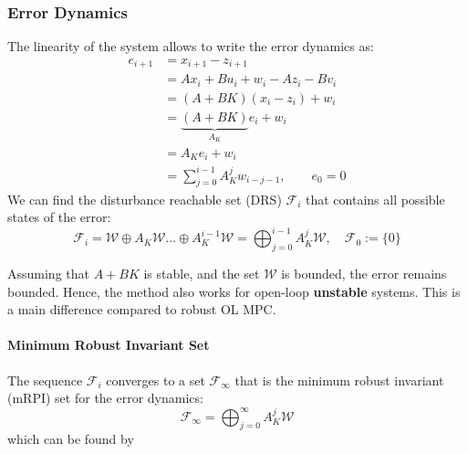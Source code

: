 \subsubsection{Error Dynamics}
The linearity of the system allows to write the error dynamics as:
\noindent\begin{align*}
    e_{i+1} & = x_{i+1} - z_{i+1}                              \\
            & = Ax_i + Bu_i + w_i - Az_i - Bv_i                \\
            & = (A+BK)(x_i - z_i) + w_i                        \\
            & = \underbrace{(A+BK)}_{A_K}e_i + w_i             \\
            & = A_K e_i + w_i                                  \\
            & = \sum_{j=0}^{i-1} A_K^j w_{i-j-1}, \qquad e_0=0
\end{align*}
We can find the disturbance reachable set (DRS) $\mathcal{F}_i$ that contains all possible states of the error:
\begin{equation*}
    \mathcal{F}_{i}=\mathcal{W}\oplus A_{K}\mathcal{W}...\oplus A_{K}^{i-1}\mathcal{W}=\bigoplus_{j=0}^{i-1}A_{K}^{j}\mathcal{W},\quad\mathcal{F}_{0}:=\{0\}
\end{equation*}

\newpar{}

Assuming that $A+BK$ is stable, and the set $\mathcal{W}$ is bounded, the error remains bounded. Hence, the method also works for open-loop \textbf{unstable} systems. This is a main difference compared to robust OL MPC.

\paragraph{Minimum Robust Invariant Set}

The sequence $\mathcal{F}_i$ converges to a set $\mathcal{F}_\infty$ that is the minimum robust invariant (mRPI) set for the error dynamics:
\begin{equation*}
    \mathcal{F}_\infty = \bigoplus_{j=0}^{\infty}A_{K}^{j}\mathcal{W}
\end{equation*}
which can be found by
\noindent{}

